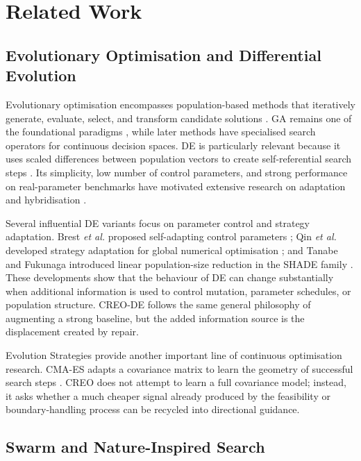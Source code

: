 \documentclass[a4paper,fleqn]{cas-sc}
\begin{document}
\section{Related Work}

\subsection{Evolutionary Optimisation and Differential Evolution}

Evolutionary optimisation encompasses population-based methods that iteratively generate, evaluate, select, and transform candidate solutions \cite{back1996evolutionary,eiben2003introduction}. GA remains one of the foundational paradigms \cite{holland1992adaptation}, while later methods have specialised search operators for continuous decision spaces. DE is particularly relevant because it uses scaled differences between population vectors to create self-referential search steps \cite{storn1997differential}. Its simplicity, low number of control parameters, and strong performance on real-parameter benchmarks have motivated extensive research on adaptation and hybridisation \cite{das2011differential}.

Several influential DE variants focus on parameter control and strategy adaptation. Brest \emph{et al.} proposed self-adapting control parameters \cite{brest2006self}; Qin \emph{et al.} developed strategy adaptation for global numerical optimisation \cite{qin2009sade}; and Tanabe and Fukunaga introduced linear population-size reduction in the SHADE family \cite{tanabe2014lshade}. These developments show that the behaviour of DE can change substantially when additional information is used to control mutation, parameter schedules, or population structure. CREO-DE follows the same general philosophy of augmenting a strong baseline, but the added information source is the displacement created by repair.

Evolution Strategies provide another important line of continuous optimisation research. CMA-ES adapts a covariance matrix to learn the geometry of successful search steps \cite{hansen2001cmaes}. CREO does not attempt to learn a full covariance model; instead, it asks whether a much cheaper signal already produced by the feasibility or boundary-handling process can be recycled into directional guidance.

\subsection{Swarm and Nature-Inspired Search}
\end{document}
